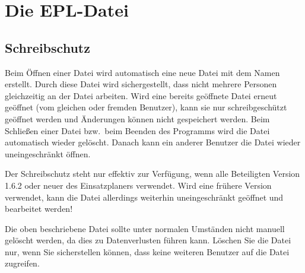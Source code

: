 \section{Die EPL-Datei}\label{epl:allg:datei}

\subsection{Schreibschutz}\label{epl:allg:datei:schreibschutz}
Beim Öffnen einer Datei  wird automatisch eine neue Datei mit dem Namen  erstellt.
Durch diese Datei wird sichergestellt, dass nicht mehrere Personen gleichzeitig an der Datei  arbeiten.
Wird eine bereits geöffnete Datei erneut geöffnet (vom gleichen oder fremden Benutzer),
kann sie nur schreibgeschützt geöffnet werden und Änderungen können nicht gespeichert werden.
Beim Schließen einer Datei bzw.\ beim Beenden des Programms wird die Datei  automatisch wieder gelöscht.
Danach kann ein anderer Benutzer die Datei wieder uneingeschränkt öffnen.

\begin{hinweis}
  Der Schreibschutz steht nur effektiv zur Verfügung, wenn alle Beteiligten Version 1.6.2 oder neuer des Einsatzplaners verwendet.
  Wird eine frühere Version verwendet, kann die Datei allerdings weiterhin uneingeschränkt geöffnet und bearbeitet werden!
\end{hinweis}


\begin{hinweis}
  Die oben beschriebene Datei sollte unter normalen Umständen nicht manuell gelöscht werden, da dies zu Datenverlusten führen kann.
  Löschen Sie die Datei nur, wenn Sie sicherstellen können, dass keine weiteren Benutzer auf die Datei zugreifen.
\end{hinweis}


